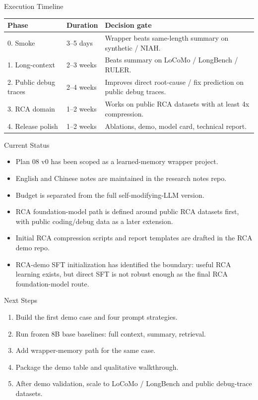\begin{frame}{Execution Timeline}
  \begin{table}
    \small
    \begin{tabular}{p{} p{} p{}}
      \toprule
      Phase & Duration & Decision gate \\
      \midrule
      0. Smoke & 3--5 days & Wrapper beats same-length summary on synthetic / NIAH. \\
      1. Long-context & 2--3 weeks & Beats summary on LoCoMo / LongBench / RULER. \\
      2. Public debug traces & 2--4 weeks & Improves direct root-cause / fix prediction on public debug traces. \\
      3. RCA domain & 1--2 weeks & Works on public RCA datasets with at least 4x compression. \\
      4. Release polish & 1--2 weeks & Ablations, demo, model card, technical report. \\
      \bottomrule
    \end{tabular}
  \end{table}
\end{frame}

\begin{frame}{Current Status}
  \begin{itemize}
    \item Plan 08 v0 has been scoped as a learned-memory wrapper project.
    \item English and Chinese notes are maintained in the research notes repo.
    \item Budget is separated from the full self-modifying-LLM version.
    \item RCA foundation-model path is defined around public RCA datasets first, with public coding/debug data as a later extension.
    \item Initial RCA compression scripts and report templates are drafted in the RCA demo repo.
    \item RCA-demo SFT initialization has identified the boundary: useful RCA learning exists, but direct SFT is not robust enough as the final RCA foundation-model route.
  \end{itemize}
\end{frame}

\begin{frame}{Next Steps}
  \begin{enumerate}
    \item Build the first demo case and four prompt strategies.
    \item Run frozen 8B base baselines: full context, summary, retrieval.
    \item Add wrapper-memory path for the same case.
    \item Package the demo table and qualitative walkthrough.
    \item After demo validation, scale to LoCoMo / LongBench and public debug-trace datasets.
  \end{enumerate}
\end{frame}

